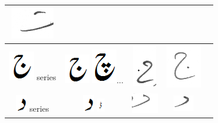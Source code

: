 \begin{table}[h]
\begin{tabular}{@{}ccccc@{}}
\includegraphics[scale=0.15]{6} \\ 
\hline
\includegraphics[scale=0.25]{jeeem} series & \includegraphics[scale=0.25]{jeeem} \includegraphics[scale=0.25]{chay_orig}... & \includegraphics[scale=0.20]{7} &
\includegraphics[scale=0.15]{8} &  \\ 
\hline
\includegraphics[scale=0.25]{daal_orig} series & \includegraphics[scale=0.25]{daal_orig} \includegraphics[scale=0.25]{dal} & \includegraphics[scale=0.20]{9} &
\includegraphics[scale=0.25]{10} & \\ 
\hline

\end{tabular}
\end{table}
